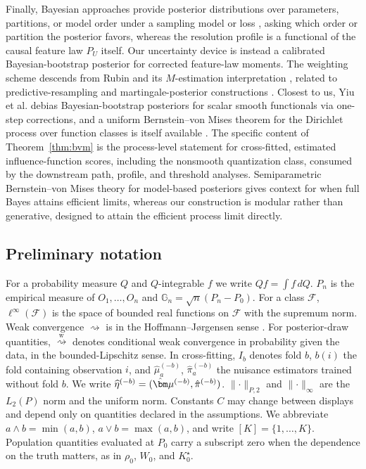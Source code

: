 \documentclass[11pt]{article}
\newcommand{\G}{\mathbb G}
\newcommand{\dto}{\rightsquigarrow}
\newcommand{\dtow}{\overset{\mathrm w}{\rightsquigarrow}}
\newcommand{\calF}{\mathcal F}
\newcommand{\bmu}{\bm\mu}
\newcommand{\hateta}{\widehat\eta}
\newcommand{\norm}[1]{\lVert #1\rVert}
\begin{document}
Finally, Bayesian approaches provide posterior distributions over parameters, partitions, or model order under a sampling model or loss \citep{miller2018,wade2018,rigon2023}, asking which order or partition the posterior favors, whereas the resolution profile is a functional of the causal feature law $P_U$ itself.
Our uncertainty device is instead a calibrated Bayesian-bootstrap posterior for corrected feature-law moments. The weighting scheme descends from Rubin \cite{rubin1981} and its $M$-estimation interpretation \citep{newton1994}, related to predictive-resampling and martingale-posterior constructions \citep{fong2023}. Closest to us, Yiu et al. \cite{yiu2025} debias Bayesian-bootstrap posteriors for scalar smooth functionals via one-step corrections, and a uniform Bernstein--von Mises theorem for the Dirichlet process over function classes is itself available \citep{rayvdv2021}. The specific content of Theorem~\ref{thm:bvm} is the process-level statement for cross-fitted, estimated influence-function scores, including the nonsmooth quantization class, consumed by the downstream path, profile, and threshold analyses. Semiparametric Bernstein--von Mises theory for model-based posteriors \citep{castillo2015,ray2020} gives context for when full Bayes attains efficient limits, whereas our construction is modular rather than generative, designed to attain the efficient process limit directly.

\subsection{Preliminary notation}\label{sec:intro:notation}

For a probability measure $Q$ and $Q$-integrable $f$ we write $Qf=\int f\,dQ$. $P_n$ is the empirical measure of $O_1,\dots,O_n$ and $\G_n=\sqrt n(P_n-P_0)$. For a class $\calF$, $\ell^\infty(\calF)$ is the space of bounded real functions on $\calF$ with the supremum norm. Weak convergence $\dto$ is in the Hoffmann--J{\o}rgensen sense \citep{vdvwellner1996}. 
For posterior-draw quantities, $\dtow$ denotes conditional weak convergence in probability given the data, in the bounded-Lipschitz sense. In cross-fitting, $I_b$ denotes fold $b$, $b(i)$ the fold containing observation $i$, and $\hat\mu^{(-b)}_a$, $\hat\pi^{(-b)}_a$ the nuisance estimators trained without fold $b$. 
We write $\hateta^{(-b)}=(\hat\bmu^{(-b)},\hat\pi^{(-b)})$. 
$\norm{\cdot}_{P,2}$ and $\norm{\cdot}_\infty$ are the $L_2(P)$ norm and the uniform norm. Constants $C$ may change between displays and depend only on quantities declared in the assumptions. 
We abbreviate $a\wedge b=\min(a,b)$, $a\vee b=\max(a,b)$, and write $[K]=\{1,\dots,K\}$. Population quantities evaluated at $P_0$ carry a subscript zero when the dependence on the truth matters, as in $\rho_0$, $W_0$, and $K^\star_0$.
\end{document}
